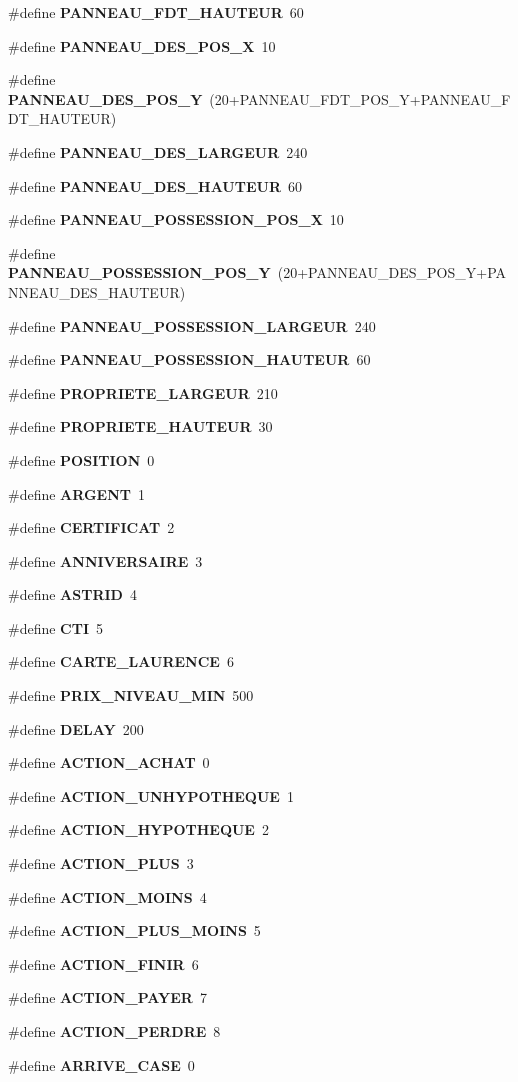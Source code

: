 \begin{CompactItemize}
\#define {\bf PANNEAU\_\-FDT\_\-HAUTEUR}~60
\item 
\#define {\bf PANNEAU\_\-DES\_\-POS\_\-X}~10
\item 
\#define {\bf PANNEAU\_\-DES\_\-POS\_\-Y}~(20+PANNEAU\_\-FDT\_\-POS\_\-Y+PANNEAU\_\-FDT\_\-HAUTEUR)
\item 
\#define {\bf PANNEAU\_\-DES\_\-LARGEUR}~240
\item 
\#define {\bf PANNEAU\_\-DES\_\-HAUTEUR}~60
\item 
\#define {\bf PANNEAU\_\-POSSESSION\_\-POS\_\-X}~10
\item 
\#define {\bf PANNEAU\_\-POSSESSION\_\-POS\_\-Y}~(20+PANNEAU\_\-DES\_\-POS\_\-Y+PANNEAU\_\-DES\_\-HAUTEUR)
\item 
\#define {\bf PANNEAU\_\-POSSESSION\_\-LARGEUR}~240
\item 
\#define {\bf PANNEAU\_\-POSSESSION\_\-HAUTEUR}~60
\item 
\#define {\bf PROPRIETE\_\-LARGEUR}~210
\item 
\#define {\bf PROPRIETE\_\-HAUTEUR}~30
\item 
\#define {\bf POSITION}~0
\item 
\#define {\bf ARGENT}~1
\item 
\#define {\bf CERTIFICAT}~2
\item 
\#define {\bf ANNIVERSAIRE}~3
\item 
\#define {\bf ASTRID}~4
\item 
\#define {\bf CTI}~5
\item 
\#define {\bf CARTE\_\-LAURENCE}~6
\item 
\#define {\bf PRIX\_\-NIVEAU\_\-MIN}~500
\item 
\#define {\bf DELAY}~200
\item 
\#define {\bf ACTION\_\-ACHAT}~0
\item 
\#define {\bf ACTION\_\-UNHYPOTHEQUE}~1
\item 
\#define {\bf ACTION\_\-HYPOTHEQUE}~2
\item 
\#define {\bf ACTION\_\-PLUS}~3
\item 
\#define {\bf ACTION\_\-MOINS}~4
\item 
\#define {\bf ACTION\_\-PLUS\_\-MOINS}~5
\item 
\#define {\bf ACTION\_\-FINIR}~6
\item 
\#define {\bf ACTION\_\-PAYER}~7
\item 
\#define {\bf ACTION\_\-PERDRE}~8
\item 
\#define {\bf ARRIVE\_\-CASE}~0
\item 

\end{CompactItemize}

